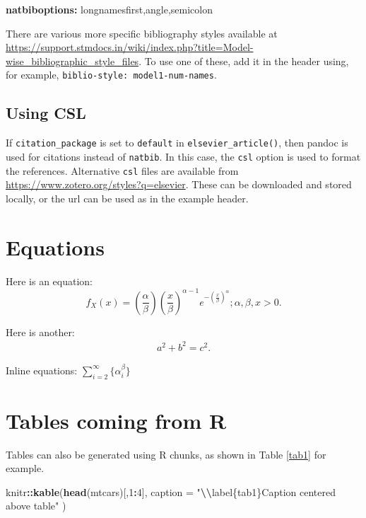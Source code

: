 \documentclass[preprint, 3p,
authoryear]{elsarticle} %
\newenvironment{Shaded}{\begin{snugshade}}{\end{snugshade}}
\newcommand{\AttributeTok}[1]{\textcolor[rgb]{0.13,0.29,0.53}{#1}}
\newcommand{\DecValTok}[1]{\textcolor[rgb]{0.00,0.00,0.81}{#1}}
\newcommand{\FunctionTok}[1]{\textcolor[rgb]{0.13,0.29,0.53}{\textbf{#1}}}
\newcommand{\KeywordTok}[1]{\textcolor[rgb]{0.13,0.29,0.53}{\textbf{#1}}}
\newcommand{\NormalTok}[1]{#1}
\newcommand{\SpecialCharTok}[1]{\textcolor[rgb]{0.81,0.36,0.00}{\textbf{#1}}}
\newcommand{\StringTok}[1]{\textcolor[rgb]{0.31,0.60,0.02}{#1}}
\begin{document}
\begin{Shaded}
\begin{Highlighting}[]
\FunctionTok{natbiboptions}\KeywordTok{:}\AttributeTok{ longnamesfirst,angle,semicolon}
\end{Highlighting}
\end{Shaded}

There are various more specific bibliography styles available at
\url{https://support.stmdocs.in/wiki/index.php?title=Model-wise_bibliographic_style_files}.
To use one of these, add it in the header using, for example,
\texttt{biblio-style:\ model1-num-names}.

\hypertarget{using-csl}{%
\subsection{Using CSL}\label{using-csl}}

If \texttt{citation\_package} is set to \texttt{default} in
\texttt{elsevier\_article()}, then pandoc is used for citations instead
of \texttt{natbib}. In this case, the \texttt{csl} option is used to
format the references. Alternative \texttt{csl} files are available from
\url{https://www.zotero.org/styles?q=elsevier}. These can be downloaded
and stored locally, or the url can be used as in the example header.

\hypertarget{equations}{%
\section{Equations}\label{equations}}

Here is an equation: \[ 
  f_{X}(x) = \left(\frac{\alpha}{\beta}\right)
  \left(\frac{x}{\beta}\right)^{\alpha-1}
  e^{-\left(\frac{x}{\beta}\right)^{\alpha}}; 
  \alpha,\beta,x > 0 .
\]

Here is another: \begin{align}
  a^2+b^2=c^2.
\end{align}

Inline equations: \(\sum_{i = 2}^\infty\{\alpha_i^\beta\}\)

\hypertarget{tables-coming-from-r}{%
\section{Tables coming from R}\label{tables-coming-from-r}}

Tables can also be generated using R chunks, as shown in Table
\ref{tab1} for example.

\begin{Shaded}
\begin{Highlighting}[]
\NormalTok{knitr}\SpecialCharTok{::}\FunctionTok{kable}\NormalTok{(}\FunctionTok{head}\NormalTok{(mtcars)[,}\DecValTok{1}\SpecialCharTok{:}\DecValTok{4}\NormalTok{], }
    \AttributeTok{caption =} \StringTok{"}\SpecialCharTok{\textbackslash{}\textbackslash{}}\StringTok{label\{tab1\}Caption centered above table"}
\NormalTok{)}
\end{Highlighting}
\end{Shaded}
\end{document}
